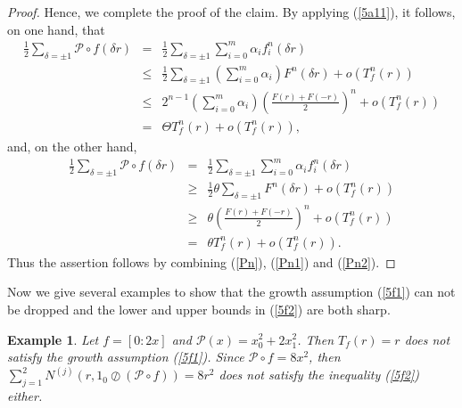 \documentclass{article}
\newtheorem{exa}[defin]{Example}
\begin{document}
\begin{proof}
    Hence, we complete the proof of the claim. By applying (\ref{5a11}), it follows, on one hand, that
    \begin{eqnarray}\label{Pn1}
        \frac{1}{2}\sum_{\delta=\pm 1}\mathcal{P}\circ f(\delta r)&=&\frac{1}{2}\sum_{\delta=\pm 1}\sum_{i=0}^{m}\alpha_{i}f_{i}^{n}(\delta r)\nonumber\\
        &\leq&\frac{1}{2}\sum_{\delta=\pm 1}\left(\sum_{i=0}^{m}\alpha_{i}\right)F^{n}(\delta r)+o(T_{f}^{n}(r))\nonumber\\
        &\leq&2^{n-1}\left(\sum_{i=0}^{m}\alpha_{i}\right)\left(\frac{F(r)+F(-r)}{2}\right)^{n}+o(T_{f}^{n}(r))\nonumber\\
        &=&\Theta T_{f}^{n}(r)+o(T_{f}^{n}(r)),
    \end{eqnarray}
    and, on the other hand, 
    \begin{eqnarray}\label{Pn2}
        \frac{1}{2}\sum_{\delta=\pm 1}\mathcal{P}\circ f(\delta r)&=&\frac{1}{2}\sum_{\delta=\pm 1}\sum_{i=0}^{m}\alpha_{i}f_{i}^{n}(\delta r)\nonumber\\
        &\geq&\frac{1}{2}\theta\sum_{\delta=\pm 1}F^{n}(\delta r)+o(T_{f}^{n}(r))\nonumber\\
        &\geq& \theta\left(\frac{F(r)+F(-r)}{2}\right)^{n}+o(T_{f}^{n}(r))\nonumber\\
        &=&\theta T_{f}^{n}(r)+o(T_{f}^{n}(r)).
    \end{eqnarray}
    Thus the assertion follows by combining (\ref{Pn}), (\ref{Pn1}) and (\ref{Pn2}).
\end{proof}

Now we give several examples to show that the growth assumption (\ref{5f1}) can not be dropped and the lower and upper bounds in (\ref{5f2}) are both sharp.

\begin{exa}
    Let $f=[0: 2x]$ and $\mathcal{P}(x)=x_{0}^{2}+2x_{1}^{2}$. Then $T_{f}(r)=r$ does not satisfy the growth assumption (\ref{5f1}). Since $\mathcal{P}\circ f=8x^{2}$, then $\sum_{j=1}^{2}N^{(j)}(r, 1_{0}\oslash (\mathcal{P}\circ f))=8r^{2}$ does not satisfy the inequality (\ref{5f2}) either.
\end{exa}
\end{document}
